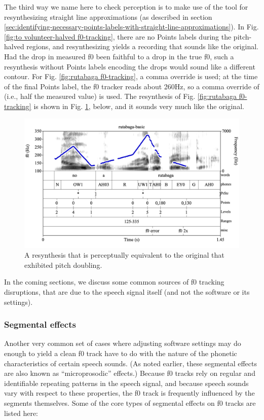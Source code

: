 \documentclass[11pt, twoside]{memoir}
\def\textlabel#1{{\relsize{-.5}\fontspec[Mapping=tex-text]{Roboto Mono}{#1}}}
\begin{document}
The third way we name here to check perception is to make use of the tool for resynthesizing straight line approximations (as described in section \ref{sec:identifying-necessary-points-labels-with-straight-line-approximations}). In Fig. \ref{fig:to volunteer-halved f0-tracking}, there are no Points labels during the pitch-halved regions, and resynthesizing yields a recording that sounds like the original. Had the drop in measured f0 been faithful to a drop in the true f0, such a resynthesis without Points labels encoding the drops would sound like a different contour. For Fig. \ref{fig:rutabaga f0-tracking}, a comma override is used; at the time of the final Points label, the f0 tracker reads about 260Hz, so a comma override of \textlabel{,130} (i.e., half the measured value) is used. The resynthesis of Fig. \ref{fig:rutabaga f0-tracking} is shown in Fig. \ref{fig:rutabaga-resynth f0-tracking}, below, and it sounds very much like the original.

\begin{figure}[H]
\centering
%
\includegraphics[width=.875\linewidth]{Contours-rutabaga-basic-resynth.png}
%
\caption{A resynthesis that is perceptually equivalent to the original that exhibited pitch doubling.%
\label{fig:rutabaga-resynth f0-tracking}%
%
}
\end{figure}

In the coming sections, we discuss some common sources of f0 tracking disruptions, that are due to the speech signal itself (and not the software or its settings).

\subsubsection{Segmental effects}\label{sec:segmental-effects}

Another very common set of cases where adjusting software settings may do enough to yield a clean f0 track have to do with the nature of the phonetic characteristics of certain speech sounds. (As noted earlier, these segmental effects are also known as “microprosodic” effects.) Because f0 tracks rely on regular and identifiable repeating patterns in the speech signal, and because speech sounds vary with respect to these properties, the f0 track is frequently influenced by the segments themselves. Some of the core types of segmental effects on f0 tracks are listed here:
\end{document}
